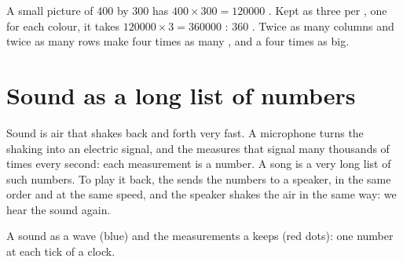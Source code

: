 \begin{example}\label{ex:g5:text-pictures-sound-as-numbers:size}
A small picture of 400 by 300  has $400 \times 300 = \num{120000}$
. Kept as three  per , one for each colour, it takes
$\num{120000} \times 3 = \num{360000}$ : 360 . Twice as many
columns and twice as many rows make four times as many , and a  four
times as big.
\end{example}

\section{Sound as a long list of numbers}

Sound is air that shakes back and forth very fast. A microphone turns the
shaking into an electric signal, and the  measures that signal many
thousands of times every second: each measurement is a number. A song is a very
long list of such numbers. To play it back, the  sends the numbers to a
speaker, in the same order and at the same speed, and the speaker shakes the
air in the same way: we hear the sound again.

\begin{omfigure}

{\small A sound as a wave (blue) and the measurements a  keeps (red
dots): one number at each tick of a clock.}
\label{fig:g5:text-pictures-sound-as-numbers:sound}
\end{omfigure}

